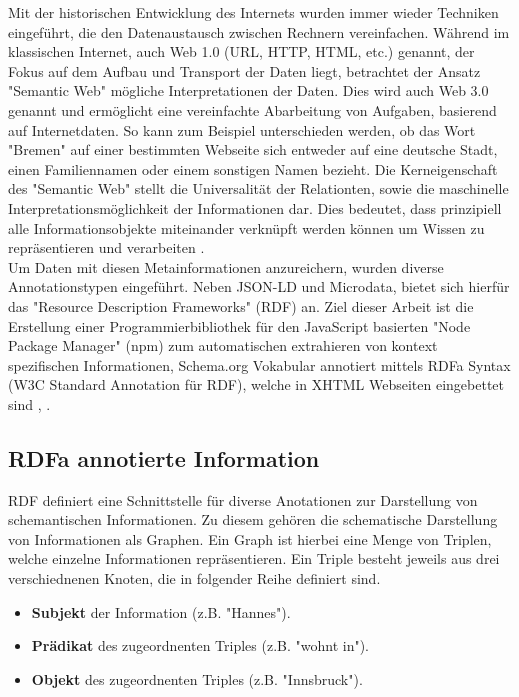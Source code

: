 \documentclass[hidelinks, a4paper, 11pt]{article} %
\begin{document}
Mit der historischen Entwicklung des Internets wurden immer wieder Techniken eingef\"uhrt, die den Datenaustausch zwischen Rechnern vereinfachen. W\"ahrend im klassischen Internet, auch Web 1.0 (URL, HTTP, HTML, etc.) genannt, der Fokus auf dem Aufbau und Transport der Daten liegt, betrachtet der Ansatz "Semantic Web" m\"ogliche Interpretationen der Daten. Dies wird auch Web 3.0 genannt und erm\"oglicht eine vereinfachte Abarbeitung von Aufgaben, basierend auf Internetdaten. So kann zum Beispiel unterschieden werden, ob das Wort "Bremen" auf einer bestimmten Webseite sich entweder auf eine deutsche Stadt, einen Familiennamen oder einem sonstigen Namen bezieht. Die Kerneigenschaft des "Semantic Web" stellt die Universalit\"at der Relationten, sowie die maschinelle Interpretationsmöglichkeit der Informationen dar. Dies bedeutet, dass prinzipiell alle Informationsobjekte miteinander verkn\"upft werden können um Wissen zu repr\"asentieren und verarbeiten \cite{berners2001semantic}. \\

Um Daten mit diesen Metainformationen anzureichern, wurden diverse Annotationstypen eingef\"uhrt. Neben JSON-LD und Microdata, bietet sich hierf\"ur das "Resource Description Frameworks" (RDF) an. Ziel dieser Arbeit ist die Erstellung einer Programmierbibliothek f\"ur den JavaScript basierten "Node Package Manager" (npm) zum automatischen extrahieren von kontext spezifischen Informationen, Schema.org Vokabular annotiert mittels RDFa Syntax (W3C Standard Annotation f\"ur RDF), welche in XHTML Webseiten eingebettet sind \cite{guha2016schema}, \cite{halb2008building}.

\subsection{RDFa annotierte Information}

RDF definiert eine Schnittstelle f\"ur diverse Anotationen zur Darstellung von schemantischen Informationen. Zu diesem geh\"oren die schematische Darstellung von Informationen als Graphen. Ein Graph ist hierbei eine Menge von Triplen, welche einzelne Informationen repr\"asentieren. Ein Triple besteht jeweils aus drei verschiednenen Knoten, die in folgender Reihe definiert sind. 

\begin{itemize}
\item \textbf{Subjekt} der Information (z.B. "Hannes").
\item \textbf{Pr\"adikat} des zugeordnenten Triples (z.B. "wohnt in").
\item \textbf{Objekt} des zugeordnenten Triples  (z.B. "Innsbruck").
\end{itemize}
\end{document}
